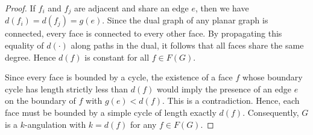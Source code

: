 \documentclass[pdflatex,sn-basic,Numbered]{sn-jnl}
\begin{document}
\begin{proof}
If $f_i$ and $f_j$ are adjacent and share an edge $e$, then we have $d(f_i) = d(f_j) = g(e)$. Since the dual graph of any planar graph is connected, every face is connected to every other face. By propagating this equality of $d(\cdot)$ along paths in the dual, it follows that all faces share the same degree. Hence $d(f)$ is constant for all $f \in F(G)$.

Since every face is bounded by a cycle, the existence of a face $f$ whose boundary cycle has length strictly less than $d(f)$ would imply the presence of an edge $e$ on the boundary of $f$ with $g(e) < d(f)$. This is a contradiction. Hence, each face must be bounded by a simple cycle of length exactly $d(f)$. Consequently, $G$ is a $k$-angulation with $k = d(f)$ for any $f \in F(G)$.
\end{proof}
\end{document}
